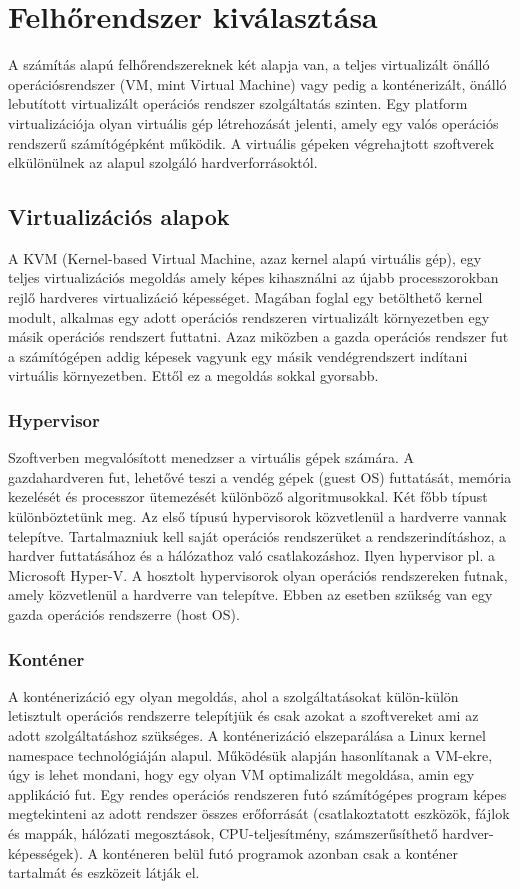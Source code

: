 \chapter{Felhőrendszer kiválasztása}
A számítás alapú felhőrendszereknek két alapja van, a teljes virtualizált önálló operációsrendszer (VM, mint Virtual Machine) vagy pedig a konténerizált, önálló lebutított virtualizált operációs rendszer szolgáltatás szinten.
Egy platform virtualizációja olyan virtuális gép létrehozását jelenti, amely egy valós operációs rendszerű számítógépként működik. A virtuális gépeken végrehajtott szoftverek elkülönülnek az alapul szolgáló hardverforrásoktól.

\section{Virtualizációs alapok}
A KVM (Kernel-based Virtual Machine, azaz kernel alapú virtuális gép), egy teljes
virtualizációs megoldás amely képes kihasználni az újabb processzorokban rejlő hardveres
virtualizáció képességet. Magában foglal egy betölthető kernel modult, alkalmas egy adott operációs rendszeren virtualizált környezetben egy másik operációs rendszert futtatni. Azaz miközben a gazda operációs rendszer fut a számítógépen addig képesek vagyunk egy másik vendégrendszert indítani virtuális környezetben. Ettől ez a megoldás sokkal gyorsabb.



\subsection{Hypervisor}
Szoftverben megvalósított menedzser a virtuális gépek számára. A gazdahardveren fut,
lehetővé teszi a vendég gépek (guest OS) futtatását, memória kezelését és processzor ütemezését különböző
algoritmusokkal. Két főbb típust különböztetünk meg. 
Az első típusú hypervisorok közvetlenül a hardverre vannak telepítve.
Tartalmazniuk kell saját operációs rendszerüket a rendszerindításhoz, a hardver futtatásához és a
hálózathoz való csatlakozáshoz. Ilyen hypervisor pl. a Microsoft Hyper-V. 
A hosztolt hypervisorok olyan operációs rendszereken futnak, amely közvetlenül a hardverre van telepítve. Ebben az esetben szükség van egy gazda operációs rendszerre (host OS).
\subsection{Konténer}
A konténerizáció egy olyan megoldás, ahol a szolgáltatásokat külön-külön letisztult operációs rendszerre telepítjük és csak azokat a szoftvereket ami az adott szolgáltatáshoz szükséges. A konténerizáció elszeparálása a Linux kernel namespace technológiáján alapul. Működésük alapján hasonlítanak a VM-ekre, úgy is lehet mondani, hogy egy olyan VM optimalizált megoldása, amin egy applikáció fut. Egy rendes operációs rendszeren futó számítógépes program képes megtekinteni az adott rendszer összes erőforrását (csatlakoztatott eszközök, fájlok és mappák, hálózati megosztások, CPU-teljesítmény, számszerűsíthető hardver-
képességek). A konténeren belül futó programok azonban csak a konténer tartalmát és eszközeit látják el.
